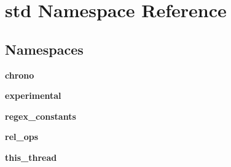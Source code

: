 \hypertarget{namespacestd}{}\section{std Namespace Reference}
\label{namespacestd}
\subsection*{Namespaces}
\begin{DoxyCompactItemize}
\item 
 \textbf{ chrono}
\item 
 \textbf{ experimental}
\item 
 \textbf{ regex\+\_\+constants}
\item 
 \textbf{ rel\+\_\+ops}
\item 
 \textbf{ this\+\_\+thread}
\end{DoxyCompactItemize}
